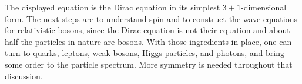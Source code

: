 \begin{classroomqa}
\end{classroomqa}

The displayed equation is the Dirac equation in its simplest \(3+1\)-dimensional form. The next steps are to understand spin and to construct the wave equations for relativistic bosons, since the Dirac equation is not their equation and about half the particles in nature are bosons. With those ingredients in place, one can turn to quarks, leptons, weak bosons, Higgs particles, and photons, and bring some order to the particle spectrum. More symmetry is needed throughout that discussion.
